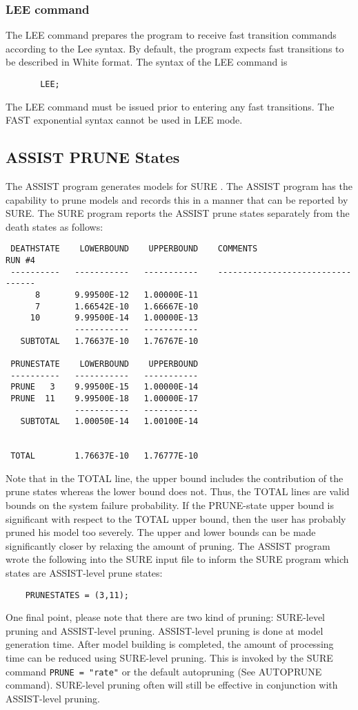 \subsubsection{LEE command} The {\isf LEE} command prepares the program
to receive fast transition commands according to the Lee syntax.  By default,
the program expects fast transitions to be described in White format.  The
syntax of the {\isf LEE} command is
\begin{verbatim}
       LEE;
\end{verbatim}
The {\isf LEE} command must be issued prior to entering any fast transitions.
The {\isf FAST} exponential syntax cannot be used in {\isf LEE} mode.
       
\subsection{ASSIST PRUNE States}
 
The ASSIST program generates models for SURE \cite{Johnson-ASSIST-man2}.  The
ASSIST program has the capability to prune models and records this in a manner
that can be reported by SURE. The SURE program reports the ASSIST prune states
separately from the death states as follows:
\begin{verbatim} 
 DEATHSTATE    LOWERBOUND    UPPERBOUND    COMMENTS                 RUN #4
 ----------   -----------   -----------    ---------------------------------
      8       9.99500E-12   1.00000E-11
      7       1.66542E-10   1.66667E-10
     10       9.99500E-14   1.00000E-13
              -----------   -----------
   SUBTOTAL   1.76637E-10   1.76767E-10
 
 PRUNESTATE    LOWERBOUND    UPPERBOUND
 ----------   -----------   -----------
 PRUNE   3    9.99500E-15   1.00000E-14
 PRUNE  11    9.99500E-18   1.00000E-17
              -----------   -----------
   SUBTOTAL   1.00050E-14   1.00100E-14
 
 
 TOTAL        1.76637E-10   1.76777E-10
\end{verbatim} 
Note that in the {\isf TOTAL} line, the upper bound includes the contribution
of the prune states whereas the lower bound does not.  Thus, the {\isf TOTAL}
lines are valid bounds on the system failure probability.  If the PRUNE-state
upper bound is significant with respect to the {\isf TOTAL} upper bound, then
the user has probably pruned his model too severely.  The upper and lower
bounds can be made significantly closer by relaxing the amount of pruning.
The ASSIST program wrote the following into the SURE input file to inform the
SURE program which states are ASSIST-level prune states:
\begin{verbatim} 
    PRUNESTATES = (3,11);
\end{verbatim}    
One final point, please note that there are two kind of pruning: SURE-level
pruning and ASSIST-level pruning.  ASSIST-level pruning is done at model
generation time.  After model building is completed, the amount of processing
time can be reduced using SURE-level pruning.  This is invoked by the SURE
command \verb|PRUNE = "rate"| or the default autopruning (See {\isf
AUTOPRUNE} command).  SURE-level pruning often will still be effective in
conjunction with ASSIST-level pruning. 



